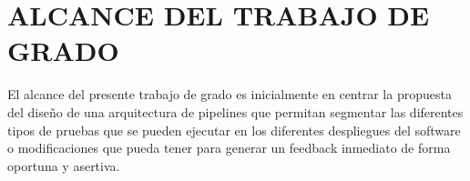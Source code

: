 \section{ALCANCE DEL TRABAJO DE GRADO }
El alcance del presente trabajo de grado es inicialmente en centrar la propuesta del diseño de una arquitectura de pipelines que permitan segmentar las diferentes tipos de pruebas que se pueden ejecutar en los diferentes despliegues del software o modificaciones que pueda tener para generar un feedback inmediato de forma oportuna y asertiva.